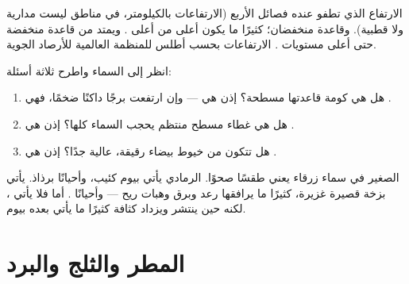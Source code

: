 \begin{omfigure}
{\small الارتفاع الذي تطفو عنده فصائل  الأربع (الارتفاعات بالكيلومتر، في
مناطق ليست مدارية ولا قطبية).  وقاعدة  منخفضان؛  كثيرًا
ما يكون أعلى من أعلى . ويمتد  من قاعدة منخفضة حتى أعلى
مستويات . الارتفاعات بحسب أطلس  للمنظمة العالمية للأرصاد
الجوية.}
\label{fig:g4:clouds-rain-snow:heights}
\end{omfigure}

\begin{method}\label{met:g4:clouds-rain-snow:naming}
انظر إلى السماء واطرح ثلاثة أسئلة:
\begin{enumerate}
  \item هل هي كومة قاعدتها مسطحة؟ إذن هي  --- وإن ارتفعت برجًا داكنًا
        ضخمًا، فهي .
  \item هل هي غطاء مسطح منتظم يحجب السماء كلها؟ إذن هي
        .
  \item هل تتكون من خيوط بيضاء رقيقة، عالية جدًا؟ إذن هي .
\end{enumerate}
\end{method}

\begin{remark}\label{rem:g4:clouds-rain-snow:tell}
 الصغير في سماء زرقاء يعني طقسًا صحوًا.  الرمادي يأتي بيوم
كئيب، وأحيانًا برذاذ.  يأتي بزخة قصيرة غزيرة، كثيرًا ما يرافقها
رعد وبرق وهبات ريح --- وأحيانًا . أما  فلا يأتي ، لكنه حين
ينتشر ويزداد كثافة كثيرًا ما يأتي  بعده
بيوم.
\end{remark}

\section{المطر والثلج والبرد}

